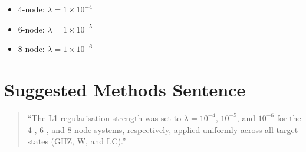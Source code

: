 \documentclass[11pt,a4paper]{article}
\begin{document}
\begin{itemize}
  \item 4-node: $\lambda = 1\times10^{-4}$
  \item 6-node: $\lambda = 1\times10^{-5}$
  \item 8-node: $\lambda = 1\times10^{-6}$
\end{itemize}

\section*{Suggested Methods Sentence}

\begin{quote}
``The L1 regularisation strength was set to
$\lambda = 10^{-4}$, $10^{-5}$, and $10^{-6}$
for the 4-, 6-, and 8-node systems, respectively,
applied uniformly across all target states (GHZ, W, and LC).''
\end{quote}
\end{document}
